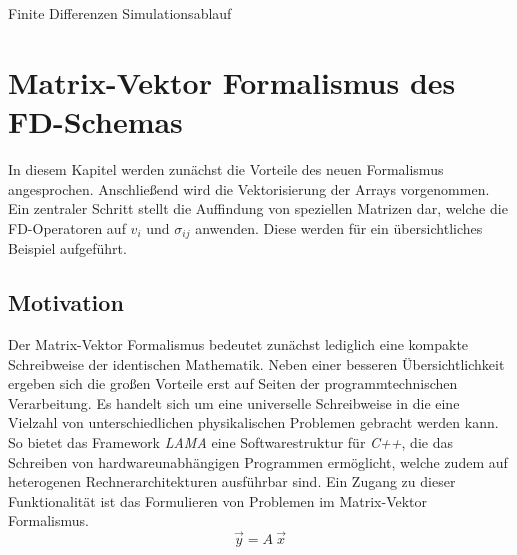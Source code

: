 \documentclass[pdftex,a4paper,parskip,listof=totoc,bibliography=totoc,onehalfspacing,12pt]{scrreprt}
\begin{document}
\begin{algorithm}[H]
\caption{Finite Differenzen Simulationsablauf}
\label{alg:FD}
\end{algorithm}

\chapter{Matrix-Vektor Formalismus des FD-Schemas}
In diesem Kapitel werden zunächst die Vorteile des neuen Formalismus angesprochen. Anschließend wird die Vektorisierung der Arrays vorgenommen. Ein zentraler Schritt stellt die Auffindung von speziellen Matrizen dar, welche die FD-Operatoren auf $v_i$ und $\sigma_{ij}$ anwenden. Diese werden für ein übersichtliches Beispiel aufgeführt.
\section{Motivation}
Der Matrix-Vektor Formalismus bedeutet zunächst lediglich eine kompakte Schreibweise der identischen Mathematik. Neben einer besseren Übersichtlichkeit ergeben sich die großen Vorteile erst auf Seiten der programmtechnischen Verarbeitung. Es handelt sich um eine universelle Schreibweise in die eine Vielzahl von unterschiedlichen physikalischen Problemen gebracht werden kann. So bietet das Framework \textit{LAMA} \citep{lama:16} eine Softwarestruktur für \textit{C++}, die das Schreiben von hardwareunabhängigen Programmen ermöglicht, welche zudem auf heterogenen Rechnerarchitekturen ausführbar sind. Ein Zugang zu dieser Funktionalität ist das Formulieren von Problemen im Matrix-Vektor Formalismus.
\begin{equation}
	\vec{y} = A~\vec{x}
\end{equation}
\end{document}
